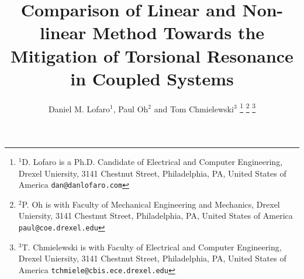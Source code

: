 \documentclass[letterpaper, 10 pt, conference]{ieeeconf}  %
\title{\LARGE \bf
Comparison of Linear and Non-linear Method Towards the Mitigation of Torsional Resonance in Coupled Systems
}
\author{Daniel M. Lofaro$^{1}$, Paul Oh$^{2}$ and Tom Chmielewski$^{3}$%
\thanks{$^{1}$D. Lofaro is a Ph.D. Candidate of Electrical and Computer Engineering,
        Drexel Uniersity, 3141 Chestnut Street, Philadelphia, PA, United States of America
        {\tt\small dan@danlofaro.com}}%
\thanks{$^{2}$P. Oh is with Faculty of Mechanical Engineering and Mechanics, Drexel Uniersity, 3141 Chestnut Street, Philadelphia, PA, United States of America
        {\tt\small paul@coe.drexel.edu}}%
\thanks{$^{3}$T. Chmielewski is with Faculty of Electrical and Computer Engineering,
        Drexel Uniersity, 3141 Chestnut Street, Philadelphia, PA, United States of America
        {\tt\small tchmiele@cbis.ece.drexel.edu}}%
}
\begin{document}
\maketitle
\thispagestyle{empty}
\pagestyle{empty}


\begin{abstract}

\end{abstract}

\IEEEpeerreviewmaketitle






%
%



\FloatBarrier

%
{}
  




\end{document}
